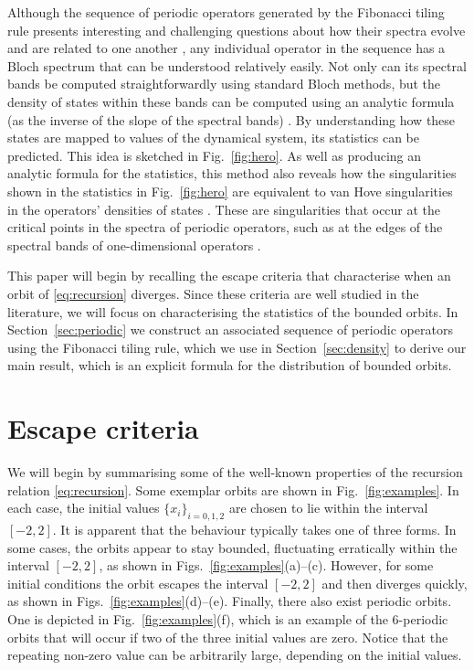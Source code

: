 \documentclass[nofootinbib,prb,amsmath,amssymb,twocolumn,floatfix]{revtex4-2}
\theoremstyle{definition}
\begin{document}
Although the sequence of periodic operators generated by the Fibonacci tiling rule presents interesting and challenging questions about how their spectra evolve and are related to one another \cite{kohmoto1984cantor, davies2023super, sutHo1989singular,sutHo1989singular, davies2025convergence, kohmoto1983localization, morini2018waves}, any individual operator in the sequence has a Bloch spectrum that can be understood relatively easily. Not only can its spectral bands be computed straightforwardly using standard Bloch methods, but the density of states within these bands can be computed using an analytic formula (as the inverse of the slope of the spectral bands) \cite{kuchment2016overview}. By understanding how these states are mapped to values of the dynamical system, its statistics can be predicted. This idea is sketched in Fig.~\ref{fig:hero}. As well as producing an analytic formula for the statistics, this method also reveals how the singularities shown in the statistics in Fig.~\ref{fig:hero} are equivalent to van Hove singularities in the operators' densities of states \cite{van1953occurrence}. These are singularities that occur at the critical points in the spectra of periodic operators, such as at the edges of the spectral bands of one-dimensional operators \cite{reed1978iv}.



This paper will begin by recalling the escape criteria that characterise when an orbit of \eqref{eq:recursion} diverges. Since these criteria are well studied in the literature, we will focus on characterising the statistics of the bounded orbits. In Section~\ref{sec:periodic} we construct an associated sequence of periodic operators using the Fibonacci tiling rule, which we use in Section~\ref{sec:density} to derive our main result, which is an explicit formula for the distribution of bounded orbits.


\section{Escape criteria} \label{sec:basicprops}

We will begin by summarising some of the well-known properties of the recursion relation \eqref{eq:recursion}. Some exemplar orbits are shown in Fig.~\ref{fig:examples}. In each case, the initial values $\{x_i\}_{i=0,1,2}$ are chosen to lie within the interval $[-2,2]$. It is apparent that the behaviour typically takes one of three forms. In some cases, the orbits appear to stay bounded, fluctuating erratically within the interval $[-2,2]$, as shown in Figs.~\ref{fig:examples}(a)--(c). However, for some initial conditions the orbit escapes the interval $[-2,2]$ and then diverges quickly, as shown in Figs.~\ref{fig:examples}(d)--(e). Finally, there also exist periodic orbits. One is depicted in Fig.~\ref{fig:examples}(f), which is an example of the 6-periodic orbits that will occur if two of the three initial values are zero. Notice that the repeating non-zero value can be arbitrarily large, depending on the initial values. %
\end{document}
